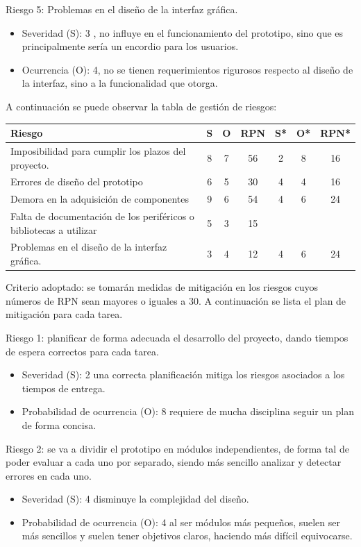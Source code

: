\documentclass[
11pt, %
codirector, %
]{charter}
\begin{document}
Riesgo 5: Problemas en el diseño de la interfaz gráfica.
\begin{itemize}
	\item Severidad (S): 3 , no influye en el funcionamiento del prototipo, sino que es principalmente sería un encordio para los usuarios.
	\item Ocurrencia (O): 4, no se tienen requerimientos rigurosos respecto al diseño de la interfaz, sino a la funcionalidad que otorga.
\end{itemize}


A continuación se puede observar la tabla de gestión de riesgos:

\begin{table}[htpb]
\centering
\begin{tabularx}{\linewidth}{@{}|X|c|c|c|c|c|c|@{}}
\hline
\rowcolor[HTML]{C0C0C0} 
Riesgo & S & O & RPN & S* & O* & RPN* \\ \hline
      Imposibilidad para cumplir los plazos del proyecto. & 8  &  7 &  56  &   2 &  8  & 16     \\ \hline
      Errores de diseño del prototipo & 6  & 5  &  30   &   4 & 4   &16      \\ \hline
      Demora en la adquisición de componentes &  9 & 6  & 54    & 4   &  6  &  24    \\ \hline
      Falta de documentación de los periféricos o bibliotecas a utilizar &  5 & 3  &  15   &    &    &      \\ \hline
      Problemas en el diseño de la interfaz gráfica. &  3 & 4  &   12  &  4  &  6  &  24    \\ \hline
\end{tabularx}%
\end{table}

Criterio adoptado: 
se tomarán medidas de mitigación en los riesgos cuyos números de RPN sean mayores o iguales a 30.
A continuación se lista el plan de mitigación para cada tarea.
 
Riesgo 1: planificar de forma adecuada el desarrollo del proyecto, dando tiempos de espera correctos para cada tarea.
\begin{itemize}
    \item Severidad (S): 2 una correcta planificación mitiga los riesgos asociados a los tiempos de entrega.
    \item Probabilidad de ocurrencia (O): 8 requiere de mucha disciplina seguir un plan de forma concisa.
\end{itemize}

Riesgo 2: se va a dividir el prototipo en módulos independientes, de forma tal de poder evaluar a cada uno por separado, siendo más sencillo analizar y detectar errores en cada uno.
\begin{itemize}
    \item Severidad (S): 4 disminuye la complejidad del diseño.
    \item Probabilidad de ocurrencia (O): 4 al ser módulos más pequeños, suelen ser más sencillos y suelen tener objetivos claros, haciendo más difícil equivocarse.
\end{itemize}
\end{document}
